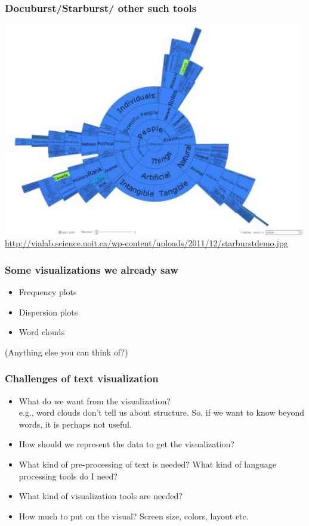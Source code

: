 \documentclass{beamer}
\begin{document}
\begin{frame}
\frametitle{Docuburst/Starburst/ other such tools}
\includegraphics[width=0.99\textwidth]{docuburst.jpeg}
\\ \scriptsize \url{http://vialab.science.uoit.ca/wp-content/uploads/2011/12/starburstdemo.jpg}
\end{frame}

\begin{frame}
\frametitle{Some visualizations we already saw}
\begin{itemize}
\item Frequency plots
\item Dispersion plots
\item Word clouds
\end{itemize}
(Anything else you can think of?)
\end{frame}

\begin{frame}
\frametitle{Challenges of text visualization}
\begin{itemize}
\item What do we want from the visualization? \pause
\\ e.g., word clouds don't tell us about structure. So, if we want to know beyond words, it is perhaps not useful. \pause
\item How should we represent the data to get the visualization?
\item What kind of pre-processing of text is needed? What kind of language processing tools do I need?
\item What kind of visualization tools are needed?
\item How much to put on the visual? Screen size, colors, layout etc.
\end{itemize}
\end{frame}
\end{document}
